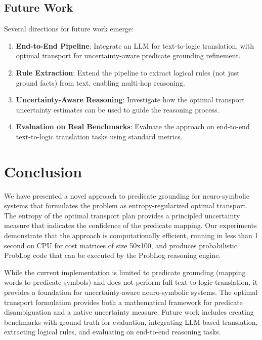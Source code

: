 \documentclass[11pt,letterpaper]{article}
\begin{document}
\subsection{Future Work}

Several directions for future work emerge:

\begin{enumerate}
\item \textbf{End-to-End Pipeline}: Integrate an LLM for text-to-logic translation, with optimal transport for uncertainty-aware predicate grounding refinement.

\item \textbf{Rule Extraction}: Extend the pipeline to extract logical rules (not just ground facts) from text, enabling multi-hop reasoning.

\item \textbf{Uncertainty-Aware Reasoning}: Investigate how the optimal transport uncertainty estimates can be used to guide the reasoning process.

\item \textbf{Evaluation on Real Benchmarks}: Evaluate the approach on end-to-end text-to-logic translation tasks using standard metrics.
\end{enumerate}

\section{Conclusion}

We have presented a novel approach to predicate grounding for neuro-symbolic systems that formulates the problem as entropy-regularized optimal transport. The entropy of the optimal transport plan provides a principled uncertainty measure that indicates the confidence of the predicate mapping. Our experiments demonstrate that the approach is computationally efficient, running in less than 1 second on CPU for cost matrices of size 50x100, and produces probabilistic ProbLog code that can be executed by the ProbLog reasoning engine.

While the current implementation is limited to predicate grounding (mapping words to predicate symbols) and does not perform full text-to-logic translation, it provides a foundation for uncertainty-aware neuro-symbolic systems. The optimal transport formulation provides both a mathematical framework for predicate disambiguation and a native uncertainty measure. Future work includes creating benchmarks with ground truth for evaluation, integrating LLM-based translation, extracting logical rules, and evaluating on end-to-end reasoning tasks.
\end{document}
